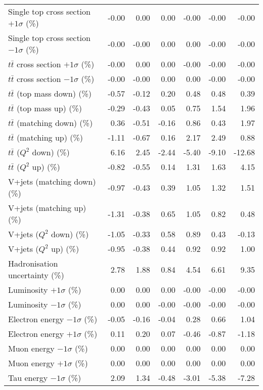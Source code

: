 \begin{table}[htbp]
{\begin{tabular}{lrrrrrr}
Single top cross section $+1\sigma$ (\%) & -0.00 & 0.00 & 0.00 & -0.00 & -0.00 & -0.00 \\ 
Single top cross section $-1\sigma$ (\%) & -0.00 & -0.00 & 0.00 & 0.00 & -0.00 & -0.00 \\ 
$t\bar{t}$ cross section $+1\sigma$ (\%) & -0.00 & 0.00 & 0.00 & -0.00 & -0.00 & -0.00 \\ 
$t\bar{t}$ cross section $-1\sigma$ (\%) & -0.00 & -0.00 & 0.00 & 0.00 & -0.00 & -0.00 \\ 
$t\bar{t}$ (top mass down) (\%) & -0.57 & -0.12 & 0.20 & 0.48 & 0.48 & 0.39 \\ 
$t\bar{t}$ (top mass up) (\%) & -0.29 & -0.43 & 0.05 & 0.75 & 1.54 & 1.96 \\ 
$t\bar{t}$ (matching down) (\%) & 0.36 & -0.51 & -0.16 & 0.86 & 0.43 & 1.97 \\ 
$t\bar{t}$ (matching up) (\%) & -1.11 & -0.67 & 0.16 & 2.17 & 2.49 & 0.88 \\ 
$t\bar{t}$ ($Q^{2}$ down) (\%) & 6.16 & 2.45 & -2.44 & -5.40 & -9.10 & -12.68 \\ 
$t\bar{t}$ ($Q^{2}$ up) (\%) & -0.82 & -0.55 & 0.14 & 1.31 & 1.63 & 4.15 \\ 
V+jets (matching down) (\%) & -0.97 & -0.43 & 0.39 & 1.05 & 1.32 & 1.51 \\ 
V+jets (matching up) (\%) & -1.31 & -0.38 & 0.65 & 1.05 & 0.82 & 0.48 \\ 
V+jets ($Q^{2}$ down) (\%) & -1.05 & -0.33 & 0.58 & 0.89 & 0.43 & -0.13 \\ 
V+jets ($Q^{2}$ up) (\%) & -0.95 & -0.38 & 0.44 & 0.92 & 0.92 & 1.00 \\ 
Hadronisation uncertainty (\%) & 2.78 & 1.88 & 0.84 & 4.54 & 6.61 & 9.35 \\ 
Luminosity $+1\sigma$ (\%) & 0.00 & 0.00 & 0.00 & -0.00 & -0.00 & -0.00 \\ 
Luminosity $-1\sigma$ (\%) & 0.00 & 0.00 & -0.00 & -0.00 & -0.00 & -0.00 \\ 
Electron energy $-1\sigma$ (\%) & -0.05 & -0.16 & -0.04 & 0.28 & 0.66 & 1.04 \\ 
Electron energy $+1\sigma$ (\%) & 0.11 & 0.20 & 0.07 & -0.46 & -0.87 & -1.18 \\ 
Muon energy $-1\sigma$ (\%) & 0.00 & 0.00 & 0.00 & 0.00 & 0.00 & 0.00 \\ 
Muon energy $+1\sigma$ (\%) & 0.00 & 0.00 & 0.00 & 0.00 & 0.00 & 0.00 \\ 
Tau energy $-1\sigma$ (\%) & 2.09 & 1.34 & -0.48 & -3.01 & -5.38 & -7.28 \\ 

\end{tabular}}
\end{table}
